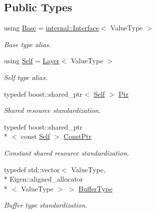\subsection*{Public Types}
\begin{DoxyCompactItemize}
\item 
using \hyperlink{classffnn_1_1layer_1_1_layer_a54b8c1b013fe141fbfc7f4dc63ab6882}{Base} = \hyperlink{classffnn_1_1layer_1_1internal_1_1_interface}{internal\-::\-Interface}$<$ Value\-Type $>$
\begin{DoxyCompactList}\small\item\em Base type alias. \end{DoxyCompactList}\item 
using \hyperlink{classffnn_1_1layer_1_1_layer_a1d461b24632a849b2c26a5051a9cdbeb}{Self} = \hyperlink{classffnn_1_1layer_1_1_layer}{Layer}$<$ Value\-Type $>$
\begin{DoxyCompactList}\small\item\em Self type alias. \end{DoxyCompactList}\item 
typedef boost\-::shared\-\_\-ptr$<$ \hyperlink{classffnn_1_1layer_1_1_layer_a1d461b24632a849b2c26a5051a9cdbeb}{Self} $>$ \hyperlink{classffnn_1_1layer_1_1_layer_ac336e7cc01ccf0117c5a4a2baf98add4}{Ptr}
\begin{DoxyCompactList}\small\item\em Shared resource standardization. \end{DoxyCompactList}\item 
typedef boost\-::shared\-\_\-ptr\\*
$<$ const \hyperlink{classffnn_1_1layer_1_1_layer_a1d461b24632a849b2c26a5051a9cdbeb}{Self} $>$ \hyperlink{classffnn_1_1layer_1_1_layer_ad7c9ea196243e78b9c1e4a3a1a17988b}{Const\-Ptr}
\begin{DoxyCompactList}\small\item\em Constant shared resource standardization. \end{DoxyCompactList}\item 
typedef std\-::vector$<$ Value\-Type, \\*
Eigen\-::aligned\-\_\-allocator\\*
$<$ Value\-Type $>$ $>$ \hyperlink{classffnn_1_1layer_1_1_layer_a3f2e9c375d9bcf80e6000e9e53ba212d}{Buffer\-Type}
\begin{DoxyCompactList}\small\item\em Buffer type standardization. \end{DoxyCompactList}\item 

\end{DoxyCompactItemize}
